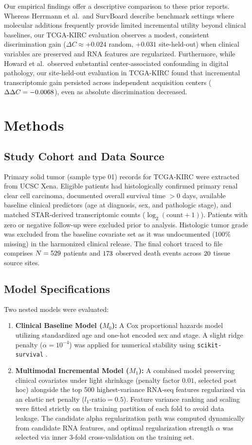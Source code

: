 \documentclass{article}
\begin{document}
Our empirical findings offer a descriptive comparison to these prior reports. Whereas Herrmann et al.\ and SurvBoard describe benchmark settings where molecular additions frequently provide limited incremental utility beyond clinical baselines, our TCGA-KIRC evaluation observes a modest, consistent discrimination gain ($\Delta C \approx +0.024$ random, $+0.031$ site-held-out) when clinical variables are preserved and RNA features are regularized. Furthermore, while Howard et al.\ observed substantial center-associated confounding in digital pathology, our site-held-out evaluation in TCGA-KIRC found that incremental transcriptomic gain persisted across independent acquisition centers ($\Delta\Delta C = -0.0068$), even as absolute discrimination decreased.

\section{Methods}

\subsection{Study Cohort and Data Source}
Primary solid tumor (sample type 01) records for TCGA-KIRC were extracted from UCSC Xena. Eligible patients had histologically confirmed primary renal clear cell carcinoma, documented overall survival time $>0$ days, available baseline clinical predictors (age at diagnosis, sex, and pathologic stage), and matched STAR-derived transcriptomic counts ($\log_2(\text{count}+1)$). Patients with zero or negative follow-up were excluded prior to analysis. Histologic tumor grade was excluded from the baseline covariate set as it was undocumented (100\% missing) in the harmonized clinical release. The final cohort traced to file comprises $N = 529$ patients and $173$ observed death events across $20$ tissue source sites.

\subsection{Model Specifications}
Two nested models were evaluated:
\begin{enumerate}
    \item \textbf{Clinical Baseline Model ($M_0$):} A Cox proportional hazards model utilizing standardized age and one-hot encoded sex and stage. A slight ridge penalty ($\alpha = 10^{-4}$) was applied for numerical stability using \texttt{scikit-survival} \citep{polsterl2020scikit}.
    \item \textbf{Multimodal Incremental Model ($M_1$):} A combined model preserving clinical covariates under light shrinkage (penalty factor $0.01$, selected post hoc) alongside the top 500 highest-variance RNA-seq features regularized via an elastic net penalty ($l_1\text{-ratio} = 0.5$). Feature variance ranking and scaling were fitted strictly on the training partition of each fold to avoid data leakage. The candidate alpha regularization path was computed dynamically from candidate RNA features, and optimal regularization strength $\alpha$ was selected via inner 3-fold cross-validation on the training set.
\end{enumerate}
\end{document}
